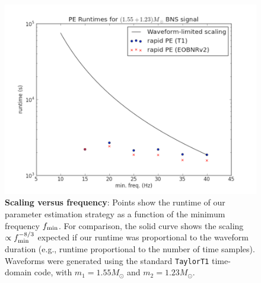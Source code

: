 
\begin{figure}
\includegraphics[width=\columnwidth]{../Figures/fig-manual-RuntimeScalingVsFmin.png}
\caption{\label{fig:fmin_scaling}\textbf{Scaling versus frequency}: Points show the runtime of our parameter estimation strategy as a function
  of the minimum frequency $f_{\rm min}$.  For comparison, the solid curve shows the scaling $\propto f_{\rm
    min}^{-8/3}$ expected if our runtime was proportional to the waveform duration (e.g., runtime proportional to the
  number of time samples). 
 Waveforms were generated using the standard \texttt{TaylorT1} time-domain code, with $m_1=1.55 M_\odot$ and $m_2=1.23 M_\odot$. 
}
\end{figure}

